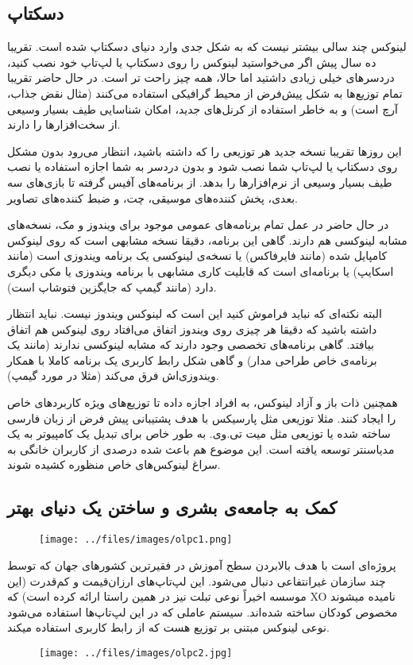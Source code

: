\subsection*{دسکتاپ}
لینوکس چند سالی بیشتر نیست که به شکل جدی وارد دنیای دسکتاپ شده است. تقریبا ده سال پیش اگر می‌خواستید لینوکس را روی دسکتاپ یا لپ‌تاپ خود نصب کنید، دردسرهای خیلی زیادی داشتید اما حالا، همه چیز راحت تر است. در حال حاضر تقریبا تمام توزیع‌ها به شکل پیش‌فرض از محیط گرافیکی استفاده می‌کنند (مثال نقض جذاب،‌ آرچ است) و به خاطر استفاده از کرنل‌های جدید، امکان شناسایی طیف بسیار وسیعی از سخت‌افزارها را دارند.

این روزها تقریبا نسخه جدید هر توزیعی را که داشته باشید، انتظار می‌رود بدون مشکل روی دسکتاپ یا لپ‌تاپ شما نصب شود و بدون دردسر به شما اجازه استفاده یا نصب طیف بسیار وسیعی از نرم‌افزارها را بدهد. از برنامه‌های آفیس گرفته تا بازی‌های سه بعدی، پخش کننده‌های موسیقی، چت، و ضبط کننده‌های تصاویر.

در حال حاضر در عمل تمام برنامه‌های عمومی موجود برای ویندوز و مک، نسخه‌های مشابه لینوکسی هم دارند. گاهی این برنامه، دقیقا نسخه مشابهی است که روی لینوکس کامپایل شده (مانند فایرفاکس) یا نسخه‌ی لینوکسی یک برنامه ویندوزی است (مانند اسکایپ) یا برنامه‌ای است که قابلیت کاری مشابهی با برنامه ویندوزی یا مکی دیگری دارد (مانند گیمپ که جایگزین فتوشاپ است).

البته نکته‌ای که نباید فراموش کنید این است که لینوکس ویندوز نیست. نباید انتظار داشته باشید که دقیقا هر چیزی روی ویندوز اتفاق می‌افتاد روی لینوکس هم اتفاق بیافتد. گاهی برنامه‌های تخصصی وجود دارند که مشابه لینوکسی ندارند (مانند یک برنامه‌ی خاص طراحی مدار) و گاهی شکل رابط کاربری یک برنامه کاملا با همکار ویندوزی‌اش فرق می‌کند (مثلا در مورد گیمپ).

همچنین ذات باز و آزاد لینوکس، به افراد اجازه داده تا توزیع‌های ویژه کاربردهای خاص را ایجاد کنند. مثلا توزیعی مثل پارسیکس با هدف پشتیبانی پیش فرض از زبان فارسی ساخته شده یا توزیعی مثل میت تی.وی. به طور خاص برای تبدیل یک کامپیوتر به یک مدیاسنتر توسعه یافته است. این موضوع هم باعث شده درصدی از کاربران خانگی به سراغ لینوکس‌های خاص منظوره کشیده شوند.
\subsection*{کمک به جامعه‌ی بشری و ساختن یک دنیای بهتر}
\begin{figure}[H]
	\texttt{[image: ../files/images/olpc1.png]}
\end{figure}


پروژه‌ای است با هدف بالابردن سطح آموزش در فقیرترین کشورهای جهان که توسط چند سازمان غیرانتفاعی دنبال می‌شود. این لپ‌تاپ‌های ارزان‌قیمت و کم‌قدرت (این موسسه اخیراً نوعی تبلت نیز در همین راستا ارائه کرده است) که XO نامیده میشوند مخصوص کودکان ساخته شده‌اند. سیستم عاملی که در این لپ‌تاپ‌ها استفاده می‌شود نوعی لینوکس مبتنی بر توزیع 
 هست که از رابط کاربری 
 استفاده میکند.
\begin{figure}
	\texttt{[image: ../files/images/olpc2.jpg]}
\end{figure}

